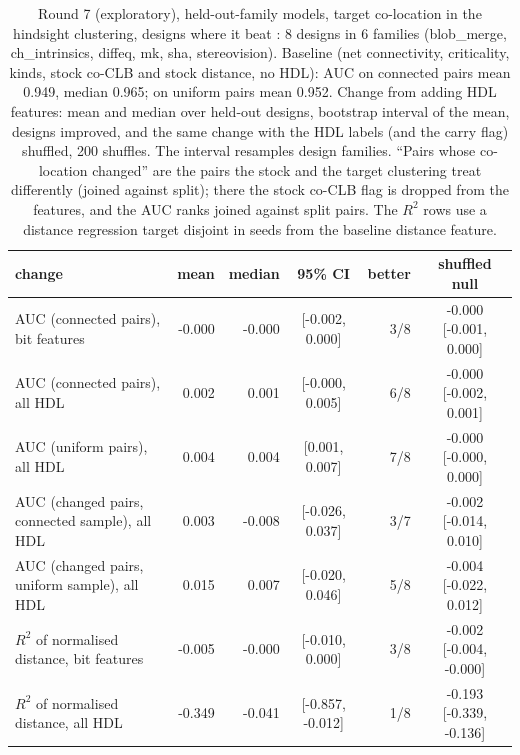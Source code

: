 \begin{table}[t]
\caption{Round 7 (exploratory), held-out-family models, target co-location in the  hindsight clustering, designs where it beat : 8 designs in 6 families (blob\_merge, ch\_intrinsics, diffeq, mk, sha, stereovision). Baseline (net connectivity, criticality, kinds, stock co-CLB and stock distance, no HDL): AUC on connected pairs mean 0.949, median 0.965; on uniform pairs mean 0.952. Change from adding HDL features: mean and median over held-out designs, bootstrap interval of the mean, designs improved, and the same change with the HDL labels (and the carry flag) shuffled, 200 shuffles. The interval resamples design families. ``Pairs whose co-location changed'' are the pairs the stock and the target clustering treat differently (joined against split); there the stock co-CLB flag is dropped from the features, and the AUC ranks joined against split pairs. The $R^2$ rows use a distance regression target disjoint in seeds from the baseline distance feature.}
\label{tab:r7modelnet}
\centering\scriptsize
\begin{tabular}{@{}lrrcrc@{}}
\toprule
change & mean & median & 95\% CI & better & shuffled null \\
\midrule
AUC (connected pairs), bit features & -0.000 & -0.000 & [-0.002, 0.000] & 3/8 & -0.000 [-0.001, 0.000] \\
AUC (connected pairs), all HDL & 0.002 & 0.001 & [-0.000, 0.005] & 6/8 & -0.000 [-0.002, 0.001] \\
AUC (uniform pairs), all HDL & 0.004 & 0.004 & [0.001, 0.007] & 7/8 & -0.000 [-0.000, 0.000] \\
AUC (changed pairs, connected sample), all HDL & 0.003 & -0.008 & [-0.026, 0.037] & 3/7 & -0.002 [-0.014, 0.010] \\
AUC (changed pairs, uniform sample), all HDL & 0.015 & 0.007 & [-0.020, 0.046] & 5/8 & -0.004 [-0.022, 0.012] \\
$R^2$ of normalised distance, bit features & -0.005 & -0.000 & [-0.010, 0.000] & 3/8 & -0.002 [-0.004, -0.000] \\
$R^2$ of normalised distance, all HDL & -0.349 & -0.041 & [-0.857, -0.012] & 1/8 & -0.193 [-0.339, -0.136] \\
\bottomrule
\end{tabular}
\end{table}

